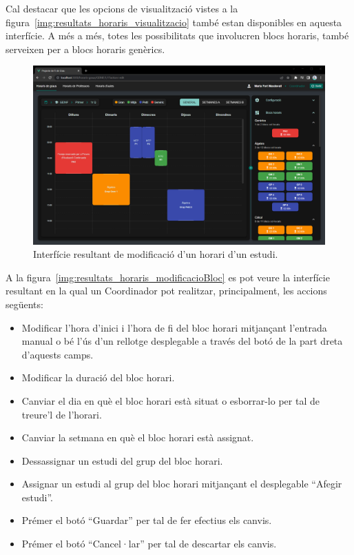 \documentclass[a4paper,12pt]{ThesisStyle}
\begin{document}
Cal destacar que les opcions de visualització vistes a la figura~\ref{img:resultats_horaris_visualitzacio} també estan disponibles en aquesta interfície. A més a més, totes les possibilitats que involucren blocs horaris, també serveixen per a blocs horaris genèrics.

\newpage

\begin{figure}[H]
  \centering
  \includegraphics[width=\textwidth]{assets/results/horaris/modificacio.png}
  \caption{\label{img:resultats_horaris_modificacio}Interfície resultant de modificació d'un horari d'un estudi.}
\end{figure}

\newpage

A la figura~\ref{img:resultats_horaris_modificacioBloc} es pot veure la interfície resultant en la qual un Coordinador pot realitzar, principalment, les accions següents:
\begin{itemize}
  \item Modificar l'hora d'inici i l'hora de fi del bloc horari mitjançant l'entrada manual o bé l'ús d'un rellotge desplegable a través del botó de la part dreta d'aquests camps.
  \item Modificar la duració del bloc horari.
  \item Canviar el dia en què el bloc horari està situat o esborrar-lo per tal de treure'l de l'horari.
  \item Canviar la setmana en què el bloc horari està assignat.
  \item Dessassignar un estudi del grup del bloc horari.
  \item Assignar un estudi al grup del bloc horari mitjançant el desplegable ``Afegir estudi''.
  \item Prémer el botó ``Guardar'' per tal de fer efectius els canvis.
  \item Prémer el botó ``Cancel·lar'' per tal de descartar els canvis.
\end{itemize}
\end{document}
